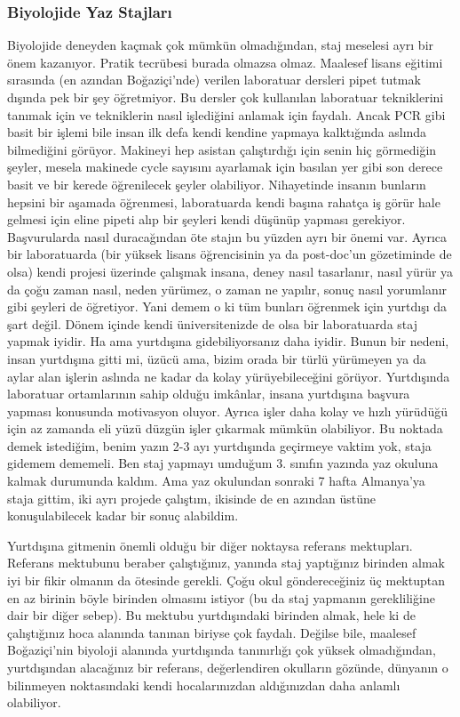 \documentclass[12pt]{article}
\theoremstyle{break}
\begin{document}
\subsubsection{Biyolojide Yaz Stajları}
Biyolojide deneyden kaçmak çok mümkün olmadığından, staj meselesi ayrı bir önem kazanıyor. Pratik tecrübesi burada olmazsa olmaz. Maalesef lisans eğitimi sırasında (en azından Boğaziçi’nde) verilen laboratuar dersleri pipet tutmak dışında pek bir şey öğretmiyor. Bu dersler çok kullanılan laboratuar tekniklerini tanımak için ve tekniklerin nasıl işlediğini anlamak için faydalı. Ancak PCR gibi basit bir işlemi bile insan ilk defa kendi kendine yapmaya kalktığında aslında bilmediğini görüyor. Makineyi hep asistan çalıştırdığı için senin hiç görmediğin şeyler, mesela makinede cycle sayısını ayarlamak için basılan yer gibi son derece basit ve bir kerede öğrenilecek şeyler olabiliyor. Nihayetinde insanın bunların hepsini bir aşamada öğrenmesi, laboratuarda kendi başına rahatça iş görür hale gelmesi için eline pipeti alıp bir şeyleri kendi düşünüp yapması gerekiyor. Başvurularda nasıl duracağından öte stajın bu yüzden ayrı bir önemi var. Ayrıca bir laboratuarda (bir yüksek lisans öğrencisinin ya da post-doc’un gözetiminde de olsa) kendi projesi üzerinde çalışmak insana, deney nasıl tasarlanır, nasıl yürür ya da çoğu zaman nasıl, neden yürümez, o zaman ne yapılır, sonuç nasıl yorumlanır gibi şeyleri de öğretiyor. Yani demem o ki tüm bunları öğrenmek için yurtdışı da şart değil. Dönem içinde kendi üniversitenizde de olsa bir laboratuarda staj yapmak iyidir.
Ha ama yurtdışına gidebiliyorsanız daha iyidir. Bunun bir nedeni, insan yurtdışına gitti mi, üzücü ama, bizim orada bir türlü yürümeyen ya da aylar alan işlerin aslında ne kadar da kolay yürüyebileceğini görüyor. Yurtdışında laboratuar ortamlarının sahip olduğu imkânlar, insana yurtdışına başvura yapması konusunda motivasyon oluyor. Ayrıca işler daha kolay ve hızlı yürüdüğü için az zamanda eli yüzü düzgün işler çıkarmak mümkün olabiliyor. Bu noktada demek istediğim, benim yazın 2-3 ayı yurtdışında geçirmeye vaktim yok, staja gidemem dememeli. Ben staj yapmayı umduğum 3. sınıfın yazında yaz okuluna kalmak durumunda kaldım. Ama yaz okulundan sonraki 7 hafta Almanya’ya staja gittim, iki ayrı projede çalıştım, ikisinde de en azından üstüne konuşulabilecek kadar bir sonuç alabildim. 

Yurtdışına gitmenin önemli olduğu bir diğer noktaysa referans mektupları. Referans mektubunu beraber çalıştığınız, yanında staj yaptığınız birinden almak iyi bir fikir olmanın da ötesinde gerekli. Çoğu okul göndereceğiniz üç mektuptan en az birinin böyle birinden olmasını istiyor (bu da staj yapmanın gerekliliğine dair bir diğer sebep). Bu mektubu yurtdışındaki birinden almak, hele ki de çalıştığınız hoca alanında tanınan biriyse çok faydalı. Değilse bile, maalesef Boğaziçi’nin biyoloji alanında yurtdışında tanınırlığı çok yüksek olmadığından, yurtdışından alacağınız bir referans, değerlendiren okulların gözünde, dünyanın o bilinmeyen noktasındaki kendi hocalarınızdan aldığınızdan daha anlamlı olabiliyor.
\end{document}
